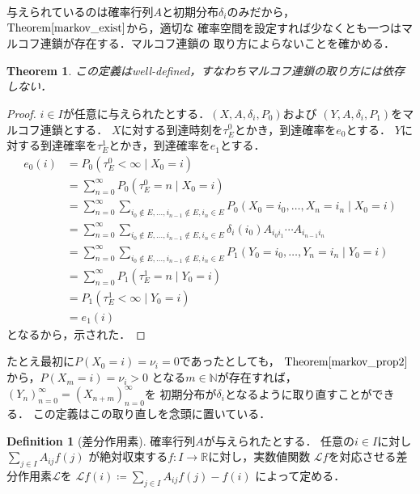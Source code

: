 \documentclass[dvipdfmx,autodetect-engine]{jsarticle}
\newtheorem{theorem}{Theorem}[section]
\theoremstyle{remark}
\theoremstyle{definition}
\newtheorem{definition}{Definition}[section]
\newcommand{\R}{\mathbb{R}}
\newcommand{\N}{\mathbb{N}}
\begin{document}
与えられているのは確率行列$A$と初期分布$\delta_i$のみだから，
$\mathrm{Theorem}\ref{markov_exist}$から，適切な
確率空間を設定すれば少なくとも一つはマルコフ連鎖が存在する．マルコフ連鎖の
取り方によらないことを確かめる．

\begin{theorem}
    この定義はwell-defined，すなわちマルコフ連鎖の取り方には依存しない．
\end{theorem}


\begin{proof}
    $i\in I$が任意に与えられたとする．$(X,A,\delta_{i},P_0)$および
    $(Y,A,\delta_{i},P_{1})$をマルコフ連鎖とする．
    $X$に対する到達時刻を$\tau_{E}^{0}$とかき，到達確率を$e_{0}$とする．
    $Y$に対する到達確率を$\tau_{E}^{1}$とかき，到達確率を$e_{1}$とする．
    \begin{align}
        e_0 (i) &= P_0(\tau_{E}^{0} < \infty \mid X_0 = i) \\
                &= \sum_{n=0}^{\infty} P_0(\tau_{E}^{0} = n \mid X_0 = i) \\
                &= \sum_{n=0}^{\infty} \sum_{i_0 \notin E,\ldots, 
                i_{n-1} \notin E, i_n \in E} P_0(X_0 = i_0,\ldots,X_n = i_n \mid X_0 = i) \\
                &= \sum_{n=0}^{\infty} \sum_{i_0 \notin E,\ldots, 
                i_{n-1} \notin E, i_n \in E} \delta_{i}(i_0) A_{i_0 i_1} \cdots A_{i_{n-1} i_{n}} \\
                &= \sum_{n=0}^{\infty} \sum_{i_0 \notin E,\ldots, 
                i_{n-1} \notin E, i_n \in E} P_1(Y_0 = i_0,\ldots,Y_n = i_n \mid Y_0 = i) \\
                &= \sum_{n=0}^{\infty} P_1(\tau_{E}^{1} = n \mid Y_0 = i)\\
                &= P_1(\tau_{E}^{1} < \infty \mid Y_0 = i) \\
                &= e_1(i)
    \end{align}
    となるから，示された．
\end{proof}


たとえ最初に$P(X_0 = i) = \nu_i = 0$であったとしても，
$\mathrm{Theorem}\ref{markov_prop2}$から，$P(X_m = i)=\nu_i >0$
となる$m \in \N$が存在すれば，
$(Y_n)_{n=0}^{\infty}=(X_{n+m})_{n=0}^{\infty}$を
初期分布が$\delta_i$となるように取り直すことができる．
この定義はこの取り直しを念頭に置いている．


\begin{definition}[差分作用素]
    確率行列$A$が与えられたとする．
    任意の$i \in I$に対し$\sum_{j \in I} A_{ij}f(j)$
    が絶対収束する$f\colon I \to \R$に対し，実数値関数
    $\mathcal{L}f$を対応させる差分作用素$\mathcal{L}$を
    $\mathcal{L}f(i) \coloneqq \sum_{j \in I} A_{ij}f(j) - f(i)$
    によって定める．
\end{definition}
\end{document}
